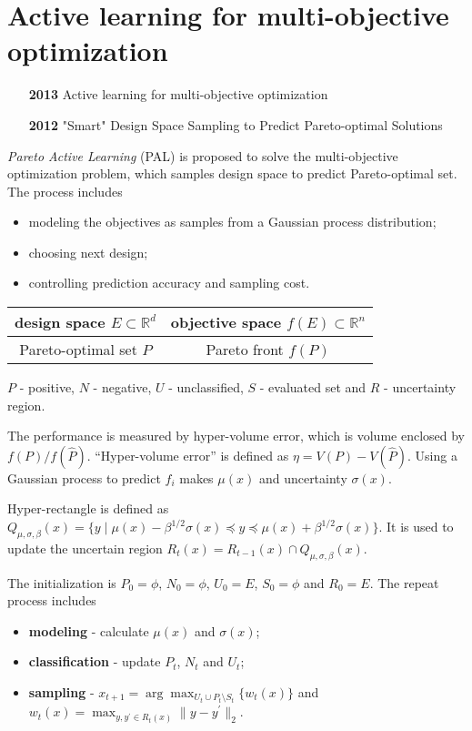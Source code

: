 \section{Active learning for multi-objective optimization}

\begin{itemize}
\item [\textbf{2013}] Active learning for multi-objective optimization~\cite{zuluaga2013active}
\item [\textbf{2012}] "Smart" Design Space Sampling to Predict Pareto-optimal Solutions~\cite{Zuluaga2012} 
\end{itemize}

\emph{Pareto Active Learning} (PAL) is proposed to solve the multi-objective optimization problem, which samples design space to predict Pareto-optimal set.
The process includes
\begin{itemize}
\item modeling the objectives as samples from a Gaussian process distribution;
\item choosing next design;
\item controlling prediction accuracy and sampling cost.
\end{itemize}

\begin{tabular}{|c|c|} \hline
design space $ E \subset \mathbb{R}^{d} $ & objective space $ f(E) \subset \mathbb{R}^{n} $ \\ \hline
Pareto-optimal set $ P $ & Pareto front $ f(P) $ \\ \hline
\end{tabular}

$ P $ - positive, 
$ N $ - negative, 
$ U $ - unclassified, 
$ S $ - evaluated set and $ R $ - uncertainty region.

The performance is measured by hyper-volume error, which is volume enclosed by $ f(P) / f(\hat{P}) $.
``Hyper-volume error'' is defined as $ \eta = V(P) - V(\hat{P}) $.
Using a Gaussian process to predict $ f_{i} $ makes $ \mu(x) $ and uncertainty $ \sigma(x) $.

Hyper-rectangle is defined as 
$ Q_{\mu, \sigma, \beta}(x) = \{ y \mid \mu(x)-\beta^{1/2} \sigma(x) \preceq  y \preceq \mu(x)+\beta^{1/2} \sigma(x) \} $.
It is used to update the uncertain region
$ R_{t}(x) = R_{t-1}(x) \cap Q_{\mu, \sigma, \beta}(x) $.

The initialization is $ P_{0} = \phi $, $ N_{0} = \phi $, $ U_{0} = E $, $ S_{0} = \phi $ and $ R_{0} = E $. 
The repeat process includes
\begin{itemize}
\item \textbf{modeling} - calculate $ \mu(x) $ and $ \sigma(x) $;
\item \textbf{classification} - update $ P_{t} $, $ N_{t} $ and $ U_{t} $;
\item \textbf{sampling} - $ x_{t+1} = \arg \max_{ U_{t} \cup P_{t} \setminus S_{t} } \{ w_{t}(x) \} $ and $ w_{t} (x) = \max_{y, y^{'} \in R_{t} (x) } \parallel y - y^{'} \parallel_{2} $.
\end{itemize}
